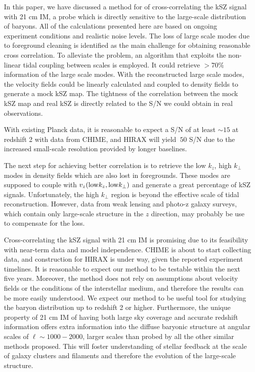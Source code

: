 In this paper, we have discussed a method for of cross-correlating the kSZ signal with 21 cm IM, a probe which is directly sensitive to the large-scale distribution of baryons. All of the calculations presented here are based on ongoing experiment conditions and realistic noise levels. 
The loss of large scale modes due to foreground cleaning is identified as the main challenge for obtaining reasonable cross correlation. 
To alleviate the problem, an algorithm that exploits the non-linear tidal coupling between scales 
is employed. 
It could retrieve $>70\%$ information of the large scale modes. 
With the reconstructed large scale modes, the velocity fields could be linearly calculated 
and coupled to density fields to generate a mock kSZ map. 
The tightness of the correlation between the mock kSZ map and real kSZ is directly related to the S/N we could obtain in 
real observations. 

With existing Planck data, it is reasonable to expect a S/N of at least $\sim15$ at redshift 2 with data from CHIME, and HIRAX will yield $~50$ S/N due to the increased small-scale resolution provided by longer baselines. 

The next step for achieving better correlation is to retrieve the low $k_z$, high $k_\perp$ modes in density fields which are also lost in foregrounds. 
These modes are supposed to couple with $v_z(\mathrm{low} k_z,\mathrm{low} k_\perp)$ and generate a great percentage of kSZ signals. 
Unfortunately, the high $k_\perp$ region is beyond the effective scale of tidal reconstruction. 
However, data from weak lensing and photo-z galaxy surveys, which contain only large-scale structure in the $z$ direction, may probably be use to compensate for the loss.
 
Cross-correlating the kSZ signal with 21 cm IM is promising due to its feasibility with near-term data and model independence. CHIME is about to start collecting data, and construction for HIRAX is under way, given the reported experiment timelines. It is reasonable to expect our method to be testable within the next five years. Moreover, the method does not rely on assumptions about velocity fields or the conditions of the interstellar medium, and therefore the results can be more easily understood. We expect our method to be useful tool for studying the baryon distribution up to redshift 2 or higher. Furthermore, the unique property of 21 cm IM of having both large sky coverage and accurate redshift information offers extra information into the diffuse baryonic structure at angular scales of $\ell\sim 1000-2000$, larger scales than probed by all the other similar methods proposed. This will foster understanding of stellar feedback at the scale of galaxy clusters and filaments and therefore the evolution of the large-scale structure.

